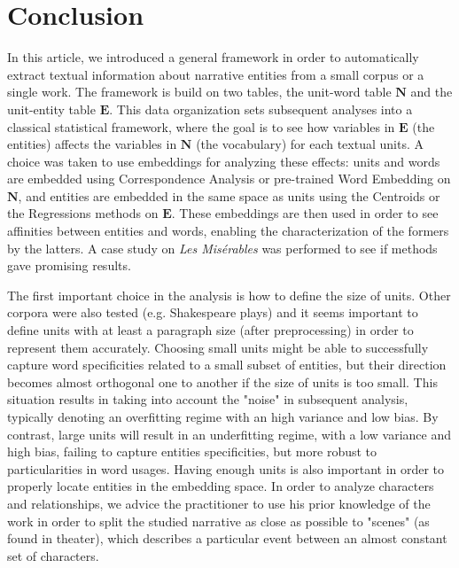 \documentclass[
twocolumn,
]{ceurart}
\begin{document}
\section{Conclusion}
\label{conclusion}

In this article, we introduced a general framework in order to automatically extract textual information about narrative entities from a small corpus or a single work. The framework is build on two tables, the unit-word table $\mathbf{N}$ and the unit-entity table $\mathbf{E}$. This data organization sets subsequent analyses into a classical statistical framework, where the goal is to see how variables in $\mathbf{E}$ (the entities) affects the variables in $\mathbf{N}$ (the vocabulary) for each textual units. A choice was taken to use embeddings for analyzing these effects: units and words are embedded using Correspondence Analysis or pre-trained Word Embedding on $\mathbf{N}$, and entities are embedded in the same space as units using the Centroids or the Regressions methods on $\mathbf{E}$. These embeddings are then used in order to see affinities between entities and words, enabling the characterization of the formers by the latters. A case study on \emph{Les Misérables} was performed to see if methods gave promising results.

The first important choice in the analysis is how to define the size of units. Other corpora were also tested (e.g. Shakespeare plays) and it seems important to define units with at least a paragraph size (after preprocessing) in order to represent them accurately. Choosing small units might be able to successfully capture word specificities related to a small subset of entities, but their direction becomes almost orthogonal one to another if the size of units is too small. This situation results in taking into account the "noise" in subsequent analysis, typically denoting an overfitting regime with an high variance and low bias. By contrast, large units will result in an underfitting regime, with a low variance and high bias, failing to capture entities specificities, but more robust to particularities in word usages. Having enough units is also important in order to properly locate entities in the embedding space. In order to analyze characters and relationships, we advice the practitioner to use his prior knowledge of the work in order to split the studied narrative as close as possible to "scenes" (as found in theater), which describes a particular event between an almost constant set of characters.
\end{document}
